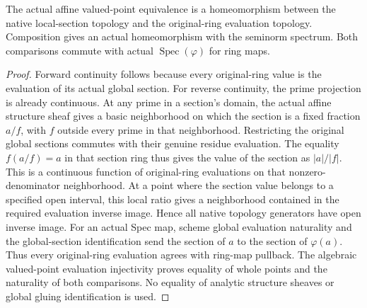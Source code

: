 \begin{theorem}
\label{scheme:affine-valued-point-homeomorphism}
\leanok
{}
The actual affine valued-point equivalence is a homeomorphism between the
native local-section topology and the original-ring evaluation topology.
Composition gives an actual homeomorphism with the seminorm spectrum. Both
comparisons commute with actual $\operatorname{Spec}(\varphi)$ for ring maps.
\end{theorem}
\begin{proof}
Forward continuity follows because every original-ring value is the evaluation
of its actual global section. For reverse continuity, the prime projection is
already continuous. At any prime in a section's domain, the actual affine
structure sheaf gives a basic neighborhood on which the section is a fixed
fraction $a/f$, with $f$ outside every prime in that neighborhood. Restricting
the original global sections commutes with their genuine residue evaluation.
The equality $f(a/f)=a$ in that section ring thus gives the value of the section
as $|a|/|f|$. This is a continuous function of original-ring evaluations on
that nonzero-denominator neighborhood. At a point where the section value
belongs to a specified open interval, this local ratio gives a neighborhood
contained in the required evaluation inverse image. Hence all native topology
generators have open inverse image. For an actual Spec map, scheme global
evaluation naturality and the global-section identification send the section
of $a$ to the section of $\varphi(a)$. Thus every original-ring evaluation
agrees with ring-map pullback. The algebraic valued-point evaluation
injectivity proves equality of whole points and the naturality of both
comparisons. No equality of analytic structure sheaves
or global gluing identification is used.
\end{proof}
